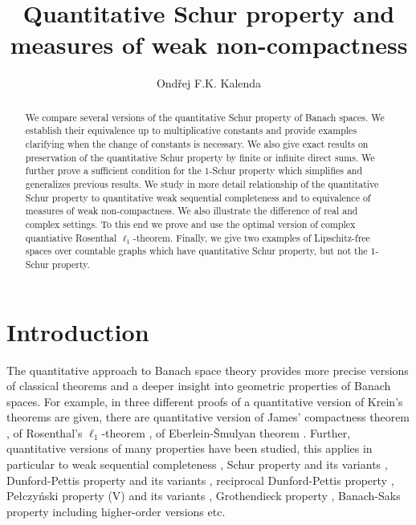 \documentclass{amsart}
\title{Quantitative Schur property and measures of weak non-compactness}
\author{Ond\v{r}ej F.K. Kalenda }
\numberwithin{equation}{section}
\theoremstyle{definition}
\begin{document}
\begin{abstract}
     We compare several versions of the quantitative Schur property of Banach spaces. We establish their equivalence up to multiplicative constants and provide examples clarifying when the change of constants is necessary. We also give exact results on preservation of the quantitative Schur property by finite or infinite direct sums. We further prove a sufficient condition for the $1$-Schur property which simplifies and generalizes previous results. 
     We study in more detail relationship of the  quantitative Schur property to quantitative weak sequential completeness and to equivalence of measures of weak non-compactness. We also illustrate the difference of real and complex settings. To this end we prove and use the optimal version of complex quantiative Rosenthal $\ell_1$-theorem. Finally, we give two examples of Lipschitz-free spaces over countable graphs which have quantitative Schur property, but not the $1$-Schur property.
    
\end{abstract}

\maketitle

\section{Introduction}

The quantitative approach to Banach space theory provides more precise versions of classical theorems and a deeper insight into geometric properties of Banach spaces. For example, in \cite{f-krein,Gr-krein,CMR} three different proofs of a quantitative version of Krein's theorems are given, there are quantitative version of James' compactness theorem \cite{CKS,Gr-James}, of Rosenthal's $\ell_1$-theorem \cite{behrends}, of Eberlein-\v{S}mulyan theorem \cite{AC-jmaa}. Further, quantitative versions of many properties have been studied, this applies in particular to weak sequential completeness \cite{wesecom}, Schur property and its variants \cite{qschur,qschur-dp,chen-posschur}, Dunford-Pettis property and its variants \cite{qdpp,p-DP}, reciprocal Dunford-Pettis property \cite{rdpp}, Pe\l{}czy\'nski property (V) and its variants \cite{haaanja-(V),haaanja-Cstar,chen-vstar},
Grothendieck property \cite{haaanja-gr,lechner-1gr}, Banach-Saks property including higher-order versions \cite{kryczka-jmaa12,krzyczka-jmaa13,BKS-bs,silber-qbs} etc.
\end{document}
